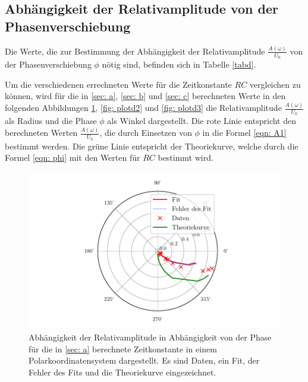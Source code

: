 \subsection{Abhängigkeit der Relativamplitude von der Phasenverschiebung}
Die Werte, die zur Bestimmung der Abhängigkeit der Relativamplitude $\frac{A(\omega)}{U_{0}}$ von der
Phasenverschiebung $\phi$ nötig sind, befinden sich in Tabelle \ref{tabd}.

Um die verschiedenen errechneten Werte für die Zeitkonstante $RC$ vergleichen
zu können, wird für die in \ref{sec: a}, \ref{sec: b} und \ref{sec: c} berechneten Werte in den folgenden Abbildungen
\ref{fig: plotd1}, \ref{fig: plotd2} und \ref{fig: plotd3} die Relativamplitude $\frac{A(\omega)}{U_{0}}$ als Radius
und die Phase $\phi$ als Winkel dargestellt. Die rote Linie entspricht den berechneten Werten 
$\frac{A(\omega)}{U_{0}}$, die durch Einsetzen von $\phi$ in die Formel \eqref{eqn: A1} bestimmt werden. Die grüne Linie entspricht der 
Theoriekurve, welche durch die Formel \eqref{eqn: phi} mit den Werten für $RC$ bestimmt wird.
\begin{figure}
  \centering
  \includegraphics[width=12cm, height=7cm]{build/plotd1.pdf}
  \caption{Abhängigkeit der Relativamplitude in Abhängigkeit von der Phase für die in \ref{sec: a} 
  berechnete Zeitkonstante in einem Polarkoordinatensystem dargestellt. Es sind Daten, ein Fit, der Fehler
  des Fits und die Theoriekurve eingezeichnet.}
  \label{fig: plotd1}
\end{figure}

